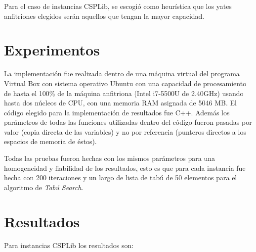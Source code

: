 \documentclass[letter, 10pt]{article}
\begin{document}
Para el caso de instancias CSPLib, se escogió como heurística que los yates anfitriones elegidos serán aquellos que tengan la mayor capacidad.

\section{Experimentos}

La implementación fue realizada dentro de una máquina virtual del programa Virtual Box con sistema operativo Ubuntu con una capacidad de procesamiento de hasta el 100\% de la máquina anfitriona (Intel i7-5500U de 2.40GHz) usando hasta dos núcleos de CPU, con una memoria RAM asignada de 5046 MB. El código elegido para la implementación de resultados fue C++. Además los parámetros de todas las funciones utilizadas dentro del código fueron pasadas por valor (copia directa de las variables) y no por referencia (punteros directos a los espacios de memoria de éstos).

Todas las pruebas fueron hechas con los mismos parámetros para una homogeneidad y fiabilidad de los resultados, esto es que para cada instancia fue hecha con 200 iteraciones y un largo de lista de tabú de 50 elementos para el algoritmo de \textit{Tabú Search}.

\section{Resultados}

Para instancias CSPLib los resultados son:
\end{document}
